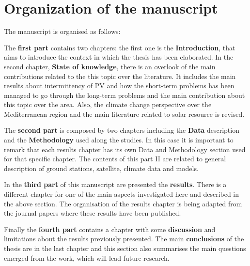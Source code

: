 \section{Organization of the manuscript}%

The manuscript is organised as follows:

The \textbf{first part} contains two chapters: the first one is the \textbf{Introduction}, that aims to introduce the context in which the thesis has been elaborated. In the second chapter, \textbf{State of knowledge}, there is an overlook of the main contributions related to the this topic over the literature. It includes the main results about intermittency of PV and how the short-term problems has been managed to go through the long-term problems and the main contribution about this topic over the area. Also, the climate change perspective over the Mediterranean region and the main literature related to solar resource is revised.

The \textbf{second part} is composed by two chapters including the \textbf{Data} description and the \textbf{Methodology} used along the studies. In this case it is important to remark that each results chapter has its own Data and Methodology section used for that specific chapter. The contents of this part II are related to general description of ground stations, satellite, climate data and models.

In the \textbf{third part} of this manuscript are presented the \textbf{results}. There is a different chapter for one of the main aspects investigated here and described in the above section. The organisation of the results chapter is being adapted from the journal papers where these results have been published.

Finally the \textbf{fourth part} contains a chapter with some \textbf{discussion} and limitations about the results previously presented. The main \textbf{conclusions} of the thesis are in the last chapter and this section also summarises the main questions emerged from the work, which will lead future research.

